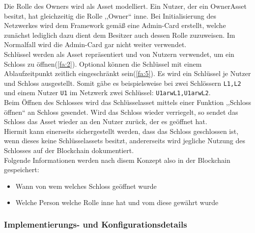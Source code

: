         \noindent Die Rolle des Owners wird als Asset modelliert. 
        Ein Nutzer, der ein OwnerAsset besitzt, hat gleichzeitig die Rolle ,,Owner`` inne.
        \noindent Bei Initialisierung des Netzwerkes wird dem Framework gemäß eine Admin-Card erstellt, welche zunächst lediglich dazu dient dem Besitzer auch dessen Rolle zuzuweisen.
        Im Normalfall wird die Admin-Card gar nicht weiter verwendet. 
        \medskip\\
        \noindent Schlüssel werden als Asset repräsentiert und von Nutzern verwendet, um ein Schloss zu öffnen(\ref{fa:2}). 
        Optional können die Schlüssel mit einem Ablaufzeitpunkt zeitlich eingeschränkt sein(\ref{fa:5}). 
        Es wird ein Schlüssel je Nutzer und Schloss ausgestellt. 
        Somit gäbe es beispielsweise bei zwei Schlössern \colorbox{light-gray}{\lstinline{L1,L2}} und einem Nutzer \colorbox{light-gray}{\lstinline{U1}} im Netzwerk zwei Schlüssel: \colorbox{light-gray}{\lstinline{U1arwL1,U1arwL2}}. \\
        Beim Öffnen des Schlosses wird das Schlüsselasset mittels einer Funktion ,,Schloss öffnen`` an Schloss gesendet.
        Wird das Schloss wieder verriegelt, so sendet das Schloss das Asset wieder an den Nutzer zurück, der es geöffnet hat. \\
        Hiermit kann einerseits sichergestellt werden, dass das Schloss geschlossen ist, wenn dieses keine Schlüsselassets besitzt, andererseits wird jegliche Nutzung des Schlosses auf der Blockchain dokumentiert. 
        \medskip\\
        \noindent Folgende Informationen werden nach disem Konzept also in der Blockchain gespeichert:
        \begin{itemize}[noitemsep]
            \item Wann von wem welches Schloss geöffnet wurde
            \item Welche Person welche Rolle inne hat und vom diese gewährt wurde
        \end{itemize}
        
    \subsubsection{Implementierungs- und Konfigurationsdetails}
